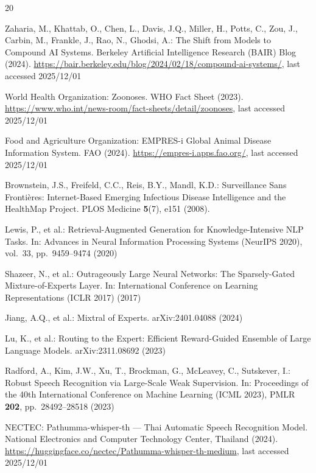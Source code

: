 \documentclass[runningheads]{llncs}
\begin{document}
% 
% 

\begin{thebibliography}{20}

Zaharia, M., Khattab, O., Chen, L., Davis, J.Q., Miller, H., Potts, C.,
Zou, J., Carbin, M., Frankle, J., Rao, N., Ghodsi, A.:
The Shift from Models to Compound AI Systems.
Berkeley Artificial Intelligence Research (BAIR) Blog (2024).
\url{https://bair.berkeley.edu/blog/2024/02/18/compound-ai-systems/},
last accessed 2025/12/01

World Health Organization: Zoonoses. WHO Fact Sheet (2023).
\url{https://www.who.int/news-room/fact-sheets/detail/zoonoses},
last accessed 2025/12/01

Food and Agriculture Organization: EMPRES-i Global Animal Disease
Information System. FAO (2024).
\url{https://empres-i.apps.fao.org/}, last accessed 2025/12/01

Brownstein, J.S., Freifeld, C.C., Reis, B.Y., Mandl, K.D.:
Surveillance Sans Fronti\`{e}res: Internet-Based Emerging Infectious
Disease Intelligence and the HealthMap Project.
PLOS Medicine \textbf{5}(7), e151 (2008). 

Lewis, P., et al.: Retrieval-Augmented Generation for
Knowledge-Intensive NLP Tasks.
In: Advances in Neural Information Processing Systems (NeurIPS 2020),
vol.~33, pp.~9459--9474 (2020)

Shazeer, N., et al.: Outrageously Large Neural Networks: The
Sparsely-Gated Mixture-of-Experts Layer.
In: International Conference on Learning Representations (ICLR 2017) (2017)

Jiang, A.Q., et al.: Mixtral of Experts. arXiv:2401.04088 (2024)

Lu, K., et al.: Routing to the Expert: Efficient Reward-Guided
Ensemble of Large Language Models. arXiv:2311.08692 (2023)

Radford, A., Kim, J.W., Xu, T., Brockman, G., McLeavey, C., Sutskever, I.:
Robust Speech Recognition via Large-Scale Weak Supervision.
In: Proceedings of the 40th International Conference on Machine Learning
(ICML 2023), PMLR \textbf{202}, pp.~28492--28518 (2023)

NECTEC: Pathumma-whisper-th --- Thai Automatic Speech Recognition Model.
National Electronics and Computer Technology Center, Thailand (2024).
\url{https://huggingface.co/nectec/Pathumma-whisper-th-medium},
last accessed 2025/12/01


\end{thebibliography}
\end{document}
